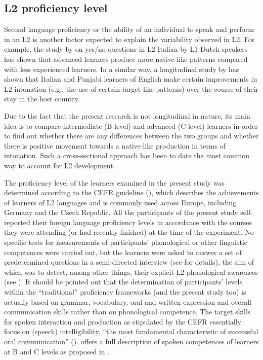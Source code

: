 \subsection{L2 proficiency level}\label{sec:2.1.2}\largerpage[2]

Second language proficiency or the ability of an individual to speak and perform in an L2 is another factor expected to explain the variability observed in L2. For example, the study by \citet{CroccoBaele2012} on yes/no questions in L2 Italian by L1 Dutch speakers has shown that advanced learners produce more native-like patterns compared with less experienced learners. In a similar way, a longitudinal study by \citet{MennenEtAl2010} has shown that Italian and Punjabi learners of English make certain improvements in L2 intonation (e.g., the use of certain target-like patterns) over the course of their stay in the host country.


Due to the fact that the present research is not longitudinal in nature, its main idea is to compare intermediate (B level) and advanced (C level) learners in order to find out whether there are any differences between the two groups and whether there is positive movement towards a native-like production in terms of intonation. Such a cross-sectional approach has been to date the most common way to account for L2 development.



The proficiency level of the learners examined in the present study was determined according to the CEFR guideline (\citealt{CEFR2001,CEFR2011, CEFR2018}), which describes the achievements of learners of L2 languages and is commonly used across Europe, including Germany and the Czech Republic. All the participants of the present study self-reported their foreign language proficiency levels in accordance with the courses they were attending (or had recently finished) at the time of the experiment. No specific tests for measurements of participants’ phonological or other linguistic competences were carried out, but the learners were asked to answer a set of predetermined questions in a semi-directed interview (see  for details), the aim of which was to detect, among other things, their explicit L2 phonological awareness (see ). It should be pointed out that the determination of participants’ levels within the “traditional” proficiency frameworks (and the present study too) is actually based on grammar, vocabulary, oral and written expression and overall communication skills rather than on phonological competence. The target skills for spoken interaction and production as stipulated by the CEFR essentially focus on (speech) intelligibility, “the most fundamental characteristic of successful oral communication” (\citealt[1]{DerwingMunro2015}).  offers a full description of spoken competences of learners at B and C levels as proposed in \citet{CEFR2018}.


